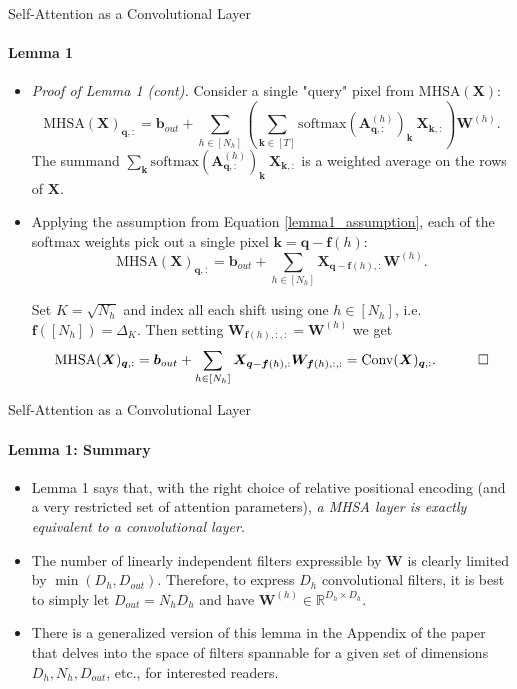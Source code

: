 \documentclass[9pt]{beamer}
\newcommand{\bb}{\mathbb}
\newcommand{\mb}{\bm}
\begin{document}
\newcommand{\row}[1]{_{#1,:}}
\newcommand{\brac}[1]{^{(#1)}}
\begin{frame}{Self-Attention as a Convolutional Layer}
\framesubtitle{Lemma 1}
\begin{itemize}
\item \textit{Proof of Lemma 1 (cont).} Consider a single "query" pixel from $\mathrm{MHSA}(\bm X)$:
\begin{equation}
    \mathrm{MHSA}(\mb X)\row {\mb q} = \mb b_{out} + 
        \sum_{h\in[N_h]} \left( \sum_{\mb k\in [T]} 
            \mathrm{softmax}(\mb A^{(h)}\row {\mb q})_{\mb k}\ \mb X\row{\mb k} 
        \right) \mb W^{(h)} .
\end{equation}
The summand $\sum_{\mb k} \mathrm{softmax}(\mb A^{(h)}\row {\mb q})_{\mb k}\ \mb X\row{\mb k}$ is a weighted average on the rows of $\bm X$. 

\item Applying the assumption from Equation \eqref{lemma1_assumption}, each of the softmax weights pick out a single pixel $\bm k = \bm q - \bm f(h)$:
\begin{equation}
    \mathrm{MHSA}(\mb X)\row {\mb q} = \mb b_{out} + 
        \sum_{h\in[N_h]}  \mb X\row{\mb q - \mb f(h)} \mb W^{(h)} .
\end{equation}

Set $K=\sqrt{N_h}$ and index all each shift using one $h\in[N_h]$, i.e.\ $\bm f([N_h]) = \Delta_K$. Then setting $\bm W_{\bm f(h),:,:} = \bm W\brac h$ we get
\begin{equation}
    \mathrm{MHSA}(\mb X)\row {\mb q} = \mb b_{out} + 
        \sum_{h\in[N_h]}  \mb X\row{\mb q - \mb f(h)} \mb W_{\mb f(h), :, :} 
        = \mathrm{Conv}(\mb X)\row{\mb q}. 
    \quad\qed
\end{equation}
\end{itemize}
\end{frame}


\begin{frame}{Self-Attention as a Convolutional Layer}
\framesubtitle{Lemma 1: Summary}
\begin{itemize}
\item Lemma 1 says that, with the right choice of relative positional encoding (and a very restricted set of attention parameters), {\em a MHSA layer is exactly equivalent to a convolutional layer}.

\vspace{.1in}
\item The number of linearly independent filters expressible by $\bm W$ is clearly limited by $\min(D_h, D_{out})$. Therefore, to express $D_h$ convolutional filters, it is best to simply let $D_{out} = N_hD_h$ and have $\bm W^{(h)}\in\bb R^{D_h\times D_h}$. 

\vspace{.1in}
\item There is a generalized version of this lemma in the Appendix of the paper that delves into the space of filters spannable for a given set of dimensions $D_h, N_h, D_{out}$, etc., for interested readers.
\end{itemize}
\end{frame}
\end{document}
